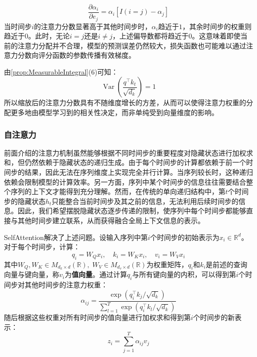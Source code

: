 \begin{note}
\begin{equation*}
		\frac{\partial\alpha_i}{\partial e_j}=\alpha_i[I(i=j)-\alpha_j]
	\end{equation*}
	当时间步$i$的注意力分数显著高于其他时间步时，$\alpha_i$趋近于$1$，其余时间步的权重则趋近于$0$。此时，无论$i=j$还是$i\neq j$，上述偏导数都将趋近于$0$。这意味着即使当前的注意力分配并不合理，模型的预测误差仍然较大，损失函数也可能难以通过注意力分数向评分函数的参数传播有效梯度。\par
	由\cref{prop:MeasurableIntegral}(6)可知：
	\begin{equation*}
		\operatorname{Var}\left(\frac{q^\top k_t}{\sqrt{d_k}}\right)=1
	\end{equation*}
	所以缩放后的注意力分数具有不随维度增长的方差，从而可以使得注意力权重的分配更多地由模型学习到的相关性决定，而非单纯受到向量维度的影响。
\end{note}
\subsubsection{自注意力}
前面介绍的注意力机制虽然能够根据不同时间步的重要程度对隐藏状态进行加权求和，但仍然依赖于隐藏状态的递归生成。由于每个时间步的计算都依赖于前一个时间步的结果，因此无法在序列维度上实现完全并行计算。当序列较长时，这种递归依赖会限制模型的计算效率。另一方面，序列中某个时间步的信息往往需要结合整个序列的上下文才能得到充分理解。然而，在传统的单向递归结构中，第$t$个时间步的隐藏状态$h_t$只能整合当前时间步及其之前的信息，无法利用后续时间步的信息。因此，我们希望摆脱隐藏状态逐步传递的限制，使序列中每个时间步都能够直接与其他时间步建立联系，从而获得融合全局上下文信息的表示。\par
\gls{SelfAttention}解决了上述问题。设输入序列中第$i$个时间步的初始表示为$x_i\in\mathbb{R}^d$。对于每个时间步，计算：
\begin{equation*}
	q_i=W_Qx_i,\quad k_i=W_Kx_i,\quad v_i=W_Vx_i
\end{equation*}
其中$W_Q,W_K\in M_{d_k\times d}(\mathbb{R}),\;W_V\in M_{d_v\times d}(\mathbb{R})$为权重矩阵，$q_i$和$k_i$是前述的查询向量与键向量，称$v_i$为\textbf{值向量}。通过计算$q_i$与所有键向量的内积，可以得到第$i$个时间步对其他时间步的注意力权重：
\begin{equation*}
	\alpha_{ij}=\frac{\exp(q_i^\top k_j/\sqrt{d_k})}{\sum\limits_{l=1}^{T}\exp(q_i^\top k_l/\sqrt{d_k})}
\end{equation*}
随后根据这些权重对所有时间步的值向量进行加权求和得到第$i$个时间步的新表示：
\begin{equation*}
	z_i=\sum_{j=1}^{T}\alpha_{ij}v_j
\end{equation*}
